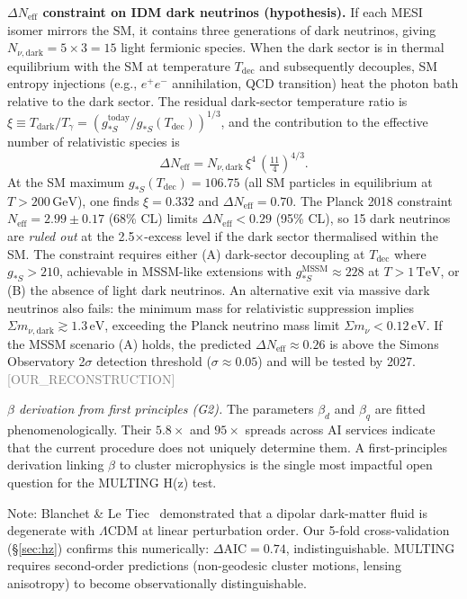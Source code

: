\documentclass[twocolumn,prd,amsmath,amssymb,floatfix]{revtex4-2}
\newcommand{\reconstruction}{\textcolor{gray}{\small[OUR\_RECONSTRUCTION]}}
\begin{document}
\textbf{$\Delta N_\mathrm{eff}$ constraint on IDM dark neutrinos (hypothesis).}
If each MESI isomer mirrors the SM, it contains three generations of dark
neutrinos, giving $N_{\nu,\mathrm{dark}} = 5 \times 3 = 15$ light fermionic
species.  When the dark sector is in thermal equilibrium with the SM at
temperature $T_\mathrm{dec}$ and subsequently decouples, SM entropy injections
(e.g., $e^+e^-$ annihilation, QCD transition) heat the photon bath relative
to the dark sector.  The residual dark-sector temperature ratio is
$\xi \equiv T_\mathrm{dark}/T_\gamma = (g_{*S}^\mathrm{today}/g_{*S}(T_\mathrm{dec}))^{1/3}$,
and the contribution to the effective number of relativistic species is
\begin{equation}
  \Delta N_\mathrm{eff} = N_{\nu,\mathrm{dark}}\,\xi^4\,\left(\tfrac{11}{4}\right)^{4/3}.
  \label{eq:dneff}
\end{equation}
At the SM maximum $g_{*S}(T_\mathrm{dec}) = 106.75$ (all SM particles in equilibrium
at $T > 200\,\mathrm{GeV}$), one finds $\xi = 0.332$ and
$\Delta N_\mathrm{eff} = 0.70$.
The Planck 2018 constraint $N_\mathrm{eff} = 2.99 \pm 0.17$ (68\% CL)
limits $\Delta N_\mathrm{eff} < 0.29$ (95\% CL), so 15 dark neutrinos are
\emph{ruled out} at the 2.5$\times$-excess level if the dark sector
thermalised within the SM.
The constraint requires either (A) dark-sector decoupling at $T_\mathrm{dec}$
where $g_{*S} > 210$, achievable in MSSM-like extensions with
$g_{*S}^\mathrm{MSSM} \approx 228$ at $T > 1\,\mathrm{TeV}$, or
(B) the absence of light dark neutrinos.
An alternative exit via massive dark neutrinos also fails: the minimum
mass for relativistic suppression implies $\Sigma m_{\nu,\mathrm{dark}} \gtrsim 1.3\,\mathrm{eV}$,
exceeding the Planck neutrino mass limit $\Sigma m_\nu < 0.12\,\mathrm{eV}$.
If the MSSM scenario (A) holds, the predicted $\Delta N_\mathrm{eff} \approx 0.26$
is above the Simons Observatory 2$\sigma$ detection threshold ($\sigma \approx 0.05$)
and will be tested by 2027.
\reconstruction

\textit{$\beta$ derivation from first principles (G2).}
The parameters $\beta_d$ and $\beta_q$ are fitted phenomenologically.
Their $5.8\times$ and $95\times$ spreads across AI services indicate
that the current procedure does not uniquely determine them.
A first-principles derivation linking $\beta$ to cluster microphysics
is the single most impactful open question for the MULTING H(z) test.

Note: Blanchet \& Le Tiec~\cite{blanchet2008, blanchet2009} demonstrated
that a dipolar dark-matter fluid is degenerate with $\Lambda$CDM at linear
perturbation order.  Our 5-fold cross-validation (§\ref{sec:hz}) confirms
this numerically: $\Delta\mathrm{AIC} = 0.74$, indistinguishable.
MULTING requires second-order predictions (non-geodesic cluster motions,
lensing anisotropy) to become observationally distinguishable.
\end{document}
